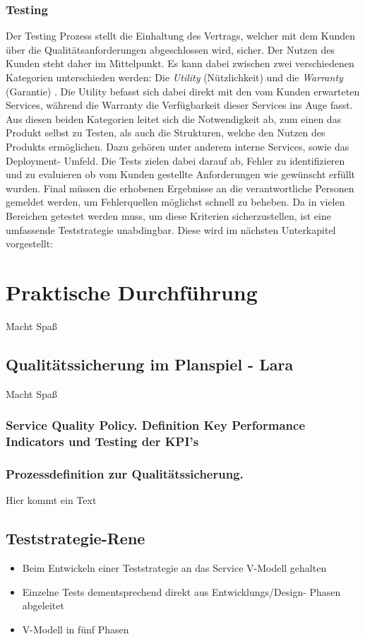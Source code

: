 \documentclass[sigconf]{acmart}
\begin{document}
\subsubsection{Testing}
Der Testing Prozess stellt die Einhaltung des Vertrags, welcher
mit dem Kunden über die Qualitätsanforderungen abgeschlossen
wird, sicher. Der Nutzen des Kunden steht daher im Mittelpunkt. Es
kann dabei zwischen zwei verschiedenen Kategorien unterschieden
werden: Die \textit{Utility} (Nützlichkeit) und die \textit{Warranty} (Garantie) \cite{Beims.2015}. Die Utility befasst sich dabei direkt mit den vom Kunden erwarteten
Services, während die Warranty die Verfügbarkeit dieser
Services ins Auge fasst. Aus diesen beiden Kategorien leitet sich die
Notwendigkeit ab, zum einen das Produkt selbst zu Testen, als auch
die Strukturen, welche den Nutzen des Produkts ermöglichen. Dazu
gehören unter anderem interne Services, sowie das Deployment-
Umfeld. Die Tests zielen dabei darauf ab, Fehler zu identifizieren und zu evaluieren ob vom Kunden gestellte Anforderungen wie gewünscht
erfüllt wurden. Final müssen die erhobenen Ergebnisse an
die verantwortliche Personen gemeldet werden, um Fehlerquellen
möglichst schnell zu beheben. Da in vielen Bereichen getestet werden
muss, um diese Kriterien sicherzustellen, ist eine umfassende
Teststrategie unabdingbar. Diese wird im nächsten Unterkapitel
vorgestellt:
\section{Praktische Durchführung}
Macht Spaß
\subsection{Qualitätssicherung im Planspiel - Lara}
Macht Spaß
\subsubsection{Service Quality Policy. Definition Key Performance Indicators und Testing der KPI’s}
\subsubsection{Prozessdefinition zur Qualitätssicherung.}
Hier kommt ein Text
\subsection{Teststrategie-Rene}
\begin{itemize}
\item Beim Entwickeln einer Teststrategie an das Service V-Modell gehalten
\item Einzelne Tests dementsprechend direkt aus Entwicklungs/Design- Phasen abgeleitet
\item V-Modell in fünf Phasen
\end{itemize}
\end{document}

